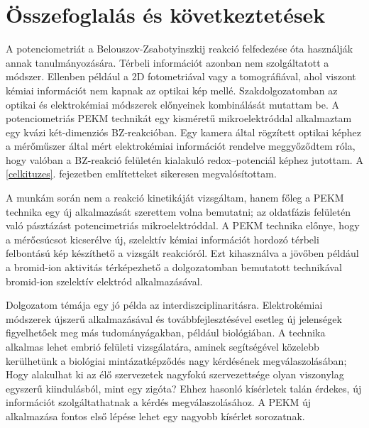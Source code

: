 \chapter{Összefoglalás és következtetések}
\pagestyle{headings}
A potenciometriát a Belouszov-Zsabotyinszkij reakció felfedezése óta használják annak tanulmányozására. Térbeli információt azonban nem szolgáltatott a módszer. Ellenben például a 2D fotometriával vagy a tomográfiával, ahol viszont kémiai információt nem kapnak az optikai kép mellé. Szakdolgozatomban az optikai és elektrokémiai módszerek előnyeinek kombinálását mutattam be. A potenciometriás PEKM technikát egy kisméretű mikroelektróddal alkalmaztam egy kvázi két-dimenziós BZ-reakcióban. Egy kamera által rögzített optikai képhez a mérőműszer által mért elektrokémiai információt rendelve meggyőződtem róla, hogy valóban a BZ-reakció felületén kialakuló redox--potenciál képhez jutottam. A \ref{celkituzes}. fejezetben említetteket sikeresen megvalósítottam.

A munkám során nem a reakció kinetikáját vizsgáltam, hanem főleg a PEKM technika egy új alkalmazását szerettem volna bemutatni; az oldatfázis felületén való pásztázást potencimetriás mikroelektróddal. A PEKM technika előnye, hogy a mérőcsúcsot kicserélve új, szelektív kémiai információt hordozó térbeli felbontású kép készíthető a vizsgált reakcióról. Ezt kihasználva a jövőben például a bromid-ion aktivitás térképezhető a dolgozatomban bemutatott technikával bromid-ion szelektív elektród alkalmazásával.

Dolgozatom témája egy jó példa az interdiszciplinaritásra. Elektrokémiai módszerek újszerű alkalmazásával és továbbfejlesztésével esetleg új jelenségek figyelhetőek meg más tudományágakban, például biológiában. A technika alkalmas lehet embrió felületi vizsgálatára, aminek segítségével közelebb kerülhetünk a biológiai mintázatképződés nagy kérdésének megválaszolásában; Hogy alakulhat ki az élő szervezetek nagyfokú szervezettsége olyan viszonylag egyszerű kiindulásból, mint egy zigóta? Ehhez hasonló kísérletek talán érdekes, új információt szolgáltathatnak a kérdés megválaszolásához. A PEKM új alkalmazása fontos első lépése lehet egy nagyobb kísérlet sorozatnak.
